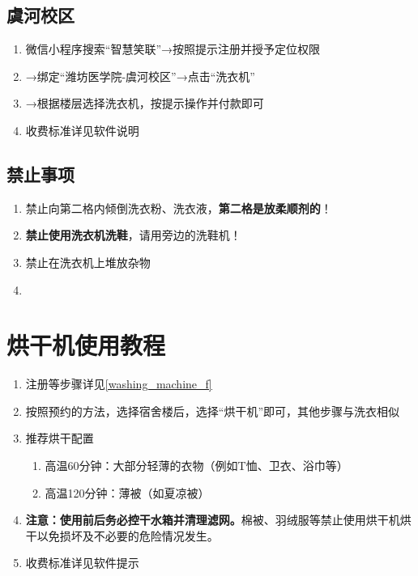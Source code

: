 \subsection[虞河校区]{虞河校区}
\label{washing_machine_y}
\begin{enumerate}
      \item 微信小程序搜索“智慧笑联”→按照提示注册并授予定位权限
      \item →绑定“潍坊医学院-虞河校区”→点击“洗衣机”
      \item →根据楼层选择洗衣机，按提示操作并付款即可
      \item 收费标准详见软件说明
\end{enumerate}
\subsection[禁止事项]{禁止事项}
\begin{enumerate}
      \item 禁止向第二格内倾倒洗衣粉、洗衣液，\textbf{第二格是放柔顺剂的}！
      \item \textbf{禁止使用洗衣机洗鞋}，请用旁边的洗鞋机！
      \item 禁止在洗衣机上堆放杂物
      \item \textbf{}
\end{enumerate}

\section[烘干机使用教程]{烘干机使用教程}
\label{dry_machine}
\begin{enumerate}
      \item 注册等步骤详见\uline{\ref{washing_machine_f}}
      \item 按照预约的方法，选择宿舍楼后，选择“烘干机”即可，其他步骤与洗衣相似
      \item 推荐烘干配置
            \begin{enumerate}
                  \item 高温60分钟：大部分轻薄的衣物（例如T恤、卫衣、浴巾等）
                  \item 高温120分钟：薄被（如夏凉被）
            \end{enumerate}
      \item \textbf{注意：}\textbf{使用前后务必控干水箱并清理滤网。}棉被、羽绒服等禁止使用烘干机烘干以免损坏及不必要的危险情况发生。
      \item 收费标准详见软件提示
\end{enumerate}

